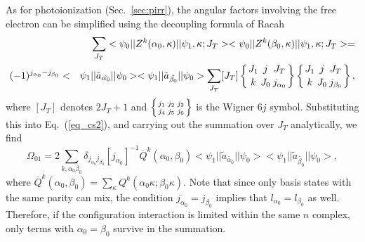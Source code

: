 As for photoionization (Sec.~\ref{sec:pirr}), the angular factors involving the
free electron can be simplified using the decoupling formula of Racah
\begin{eqnarray}
&&\sum_{J_T}<\psi_0||Z^k(\alpha_0, \kappa)||\psi_1,\kappa;J_T>
<\psi_0||Z^k(\beta_0, \kappa)||\psi_1,\kappa;J_T> = \nonumber\\*
&(-1)^{j_{\alpha_0}-j_{\beta_0}}<&\psi_1||\tilde{a}_{\tilde{\alpha_0}}||\psi_0>
<\psi_1||\tilde{a}_{\tilde{\beta_0}}||\psi_0>
\sum_{J_T}[J_T]\sixj{J_1}{j}{J_T}{k}{J_0}{j_{\alpha_0}}
\sixj{J_1}{j}{J_T}{k}{J_0}{j_{\beta_0}},
\end{eqnarray}
where $[J_T]$ denotes $2J_T+1$ and $\sixj{j_1}{j_2}{j_3}{j_4}{j_5}{j_6}$ is
the Wigner $6j$ symbol. 
Substituting this into Eq.~(\ref{eq_cs2}), and carrying
out the summation over $J_T$ analytically, we find
\begin{equation}
\label{eq_scs}
\Omega_{01} = 2\sum_{k,\alpha_0\beta_0}
\delta_{j_{\alpha_0}j_{\beta_0}}[j_{\alpha_0}]^{-1} 
\overline{Q}^k(\alpha_0,\beta_0)
<\psi_1||\tilde{a}_{\tilde{\alpha_0}}||\psi_0>
<\psi_1||\tilde{a}_{\tilde{\beta_0}}||\psi_0>,
\end{equation}
where $\overline{Q}^k(\alpha_0,\beta_0) = \sum_\kappa
Q^k(\alpha_0\kappa;\beta_0\kappa)$.
Note that since only basis states with the same parity can mix, the condition
$j_{\alpha_0}=j_{\beta_0}$ implies that $l_{\alpha_0} = l_{\beta_0}$ as
well. Therefore, if the configuration interaction is limited within the same
$n$ complex, only terms with $\alpha_0 = \beta_0$ survive in the summation. 

